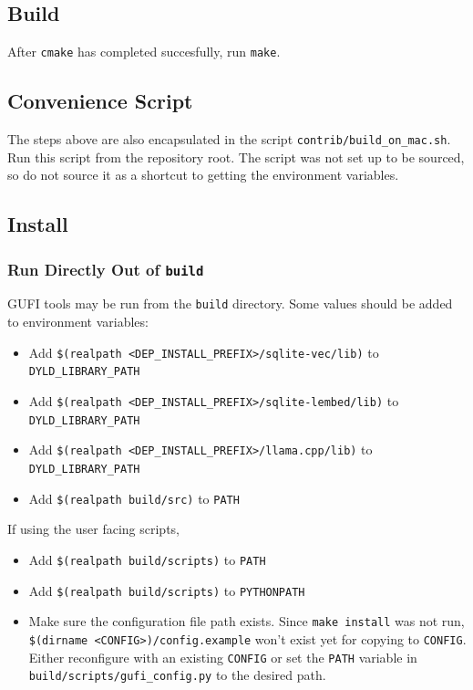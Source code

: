 \subsection{Build}
After \texttt{cmake} has completed succesfully, run \texttt{make}.

\subsection{Convenience Script}
The steps above are also encapsulated in the script
\texttt{contrib/build\_on\_mac.sh}. Run this script from the
repository root. The script was not set up to be sourced, so do not
source it as a shortcut to getting the environment variables.

\subsection{Install}
\subsubsection{Run Directly Out of \texttt{build}}
GUFI tools may be run from the \texttt{build} directory. Some values
should be added to environment variables:

\begin{itemize}
  \item Add \texttt{\$(realpath
    <DEP\_INSTALL\_PREFIX>/sqlite-vec/lib)} to
    \texttt{DYLD\_LIBRARY\_PATH}
  \item Add \texttt{\$(realpath
    <DEP\_INSTALL\_PREFIX>/sqlite-lembed/lib)} to
    \texttt{DYLD\_LIBRARY\_PATH}
  \item Add \texttt{\$(realpath
    <DEP\_INSTALL\_PREFIX>/llama.cpp/lib)} to
    \texttt{DYLD\_LIBRARY\_PATH}
  \item Add \texttt{\$(realpath build/src)} to \texttt{PATH}
\end{itemize}

\noindent If using the user facing scripts,

\begin{itemize}
  \item Add \texttt{\$(realpath build/scripts)} to \texttt{PATH}
  \item Add \texttt{\$(realpath build/scripts)} to \texttt{PYTHONPATH}
  \item Make sure the configuration file path exists. Since
    \texttt{make install} was not run,
    \texttt{\$(dirname~<CONFIG>)/config.example} won't exist
    yet for copying to \texttt{CONFIG}. Either reconfigure
    with an existing \texttt{CONFIG} or set the \texttt{PATH}
    variable in \texttt{build/scripts/gufi\_config.py} to the desired
    path.
\end{itemize}

